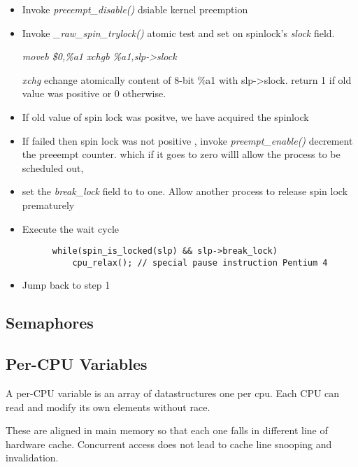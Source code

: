 \documentclass{article}
\begin{document}
  \begin{itemize}
    \item Invoke \emph{preeempt\_disable()} dsiable kernel preemption
    \item Invoke \emph{\_raw\_spin\_trylock()} atomic test and set on
      spinlock's \emph{slock} field.

      \emph{moveb \$0,\%a1}
      \emph{xchgb \%a1,slp->slock}

      \emph{xchg} echange atomically content of 8-bit \%a1 with slp->slock.
      return 1 if old value was positive or 0 otherwise.

    \item If old value of spin lock was positve, we have acquired the spinlock
        
    \item If failed then spin lock was not positive , invoke
      \emph{preempt\_enable()} decrement the preeempt counter. which
      if it goes to zero willl allow the process to be scheduled out,

    \item set the \emph{break\_lock} field to to one. Allow another
      process to release spin lock prematurely

    \item Execute the wait cycle
      \begin{lstlisting}
      while(spin_is_locked(slp) && slp->break_lock)
          cpu_relax(); // special pause instruction Pentium 4
      \end{lstlisting}
    \item Jump back to step 1 
      
  \end{itemize}


  



\subsection{Semaphores}




\subsection{Per-CPU Variables}

A per-CPU variable is an array of datastructures one per cpu. Each CPU
can read and modify its own elements without race.

These are aligned in main memory so that each one falls in different
line of hardware cache. Concurrent access does not lead to cache line
snooping and invalidation.
\end{document}
